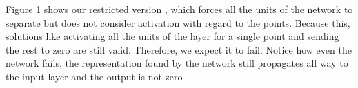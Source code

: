 \begin{figure}
{{    %
    }
    \parbox{.195\textwidth}{%
    }
  }
  \caption{\SepUnit}
    \label{fig:moonsUnitwise}
\end{figure}


Figure \ref{fig:moonsUnitwise} shows our restricted version \SepUnit, which forces all the units of the network to separate but does not consider activation with regard to the points. Because this, solutions like activating all the units of the layer for a single point and sending the rest to zero are still valid. Therefore, we expect it to fail. Notice how even the network fails, the representation found by the network still propagates all way to the input layer and the output is not zero 

